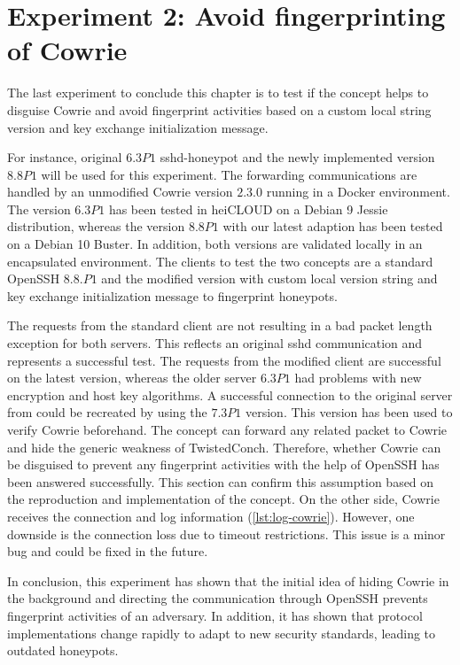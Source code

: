 \section{Experiment 2: Avoid fingerprinting of Cowrie}

The last experiment to conclude this chapter is to test if the concept helps to disguise Cowrie and avoid fingerprint activities based on a custom local string version and key exchange initialization message.

For instance, \citet{vetterl2020} original $6.3P1$ sshd-honeypot and the newly implemented version $8.8P1$ will be used for this experiment.
The forwarding communications are handled by an unmodified Cowrie version $2.3.0$ running in a Docker environment.
The version $6.3P1$ has been tested in heiCLOUD on a Debian 9 Jessie distribution, whereas the version $8.8P1$ with our latest adaption has been tested on a Debian 10 Buster.
In addition, both versions are validated locally in an encapsulated environment.
The clients to test the two concepts are a standard OpenSSH $8.8.P1$ and the modified version with custom local version string and key exchange initialization message to fingerprint honeypots.

The requests from the standard client are not resulting in a bad packet length exception for both servers.
This reflects an original sshd communication and represents a successful test.
The requests from the modified client are successful on the latest version, whereas the older server $6.3P1$ had problems with new encryption and host key algorithms.
A successful connection to the original server from \citet*{vetterl2020} could be recreated by using the $7.3P1$ version.
This version has been used to verify Cowrie beforehand.
The concept can forward any related packet to Cowrie and hide the generic weakness of TwistedConch.
Therefore, whether Cowrie can be disguised to prevent any fingerprint activities with the help of OpenSSH has been answered successfully.
This section can confirm this assumption based on the reproduction and implementation of the concept.
On the other side, Cowrie receives the connection and log information (\autoref{lst:log-cowrie}).
However, one downside is the connection loss due to timeout restrictions.
This issue is a minor bug and could be fixed in the future.

In conclusion, this experiment has shown that the initial idea of hiding Cowrie in the background and directing the communication through OpenSSH prevents fingerprint activities of an adversary.
In addition, it has shown that protocol implementations change rapidly to adapt to new security standards, leading to outdated honeypots.

